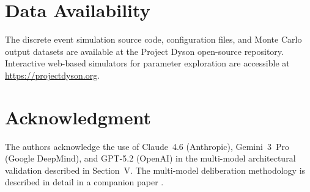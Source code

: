 \documentclass[journal]{IEEEtran}
\begin{document}
\section*{Data Availability}

The discrete event simulation source code, configuration files, and Monte Carlo output datasets are available at the Project Dyson open-source repository. Interactive web-based simulators for parameter exploration are accessible at \url{https://projectdyson.org}.

\section*{Acknowledgment}

The authors acknowledge the use of Claude~4.6 (Anthropic), Gemini~3~Pro (Google DeepMind), and GPT-5.2 (OpenAI) in the multi-model architectural validation described in Section~V. The multi-model deliberation methodology is described in detail in a companion paper \cite{dyson_multimodel}.
\end{document}
